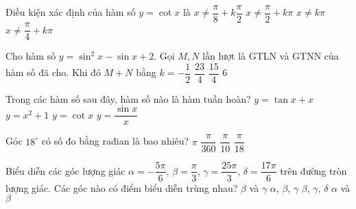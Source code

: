 \begin{ex}%
	Điều kiện xác định của hàm số $y=\cot x$ là
	\choice
	{ $x \ne \dfrac{\pi}{8}+k\dfrac{\pi}{2}$}
	{$x \ne \dfrac{\pi}{2}+k\pi$}
	{\True $x \ne k\pi$}
	{$x \ne \dfrac{\pi}{4}+k\pi$}
\end{ex}

\begin{ex}%
	Cho hàm số $y=\sin^2x-\sin x+2$. Gọi $M,N$ lần lượt là GTLN và GTNN của hàm số đã cho. Khi đó $M+N$ bằng
	\choice
	{$k=-\dfrac{1}{2}$}
	{\True $\dfrac{23}{4}$}
	{$\dfrac{15}{4}$}
	{$6$}
\end{ex}

\begin{ex}%
	Trong các hàm số sau đây, hàm số nào là hàm tuần hoàn?
	\choice
	{$y=\tan x+x$}
	{$y=x^2+1$}
	{\True $y=\cot x$}
	{$y=\dfrac{\sin x}{x}$}
\end{ex}

\begin{ex}%
	Góc $18^\circ$ có số đo bằng rađian là bao nhiêu?
	\choice
	{$\pi$}
	{$\dfrac{\pi}{360}$}
	{\True $\dfrac{\pi}{10}$}
	{$\dfrac{\pi}{18}$}
\end{ex}

\begin{ex}%
	Biểu diễn các góc lượng giác $\alpha=-\dfrac{5\pi}{6}$, $\beta=\dfrac{\pi}{3}$, $\gamma=\dfrac{25\pi}{3}$, $\delta=\dfrac{17\pi}{6}$ trên đường tròn lượng giác. Các góc nào có điểm biểu diễn trùng nhau?
	\choice
	{\True $\beta$ và $\gamma$}
	{$\alpha$, $\beta$, $\gamma$}
	{$\beta$, $\gamma$, $\delta$}
	{$\alpha$ và $\beta$}
\end{ex}

